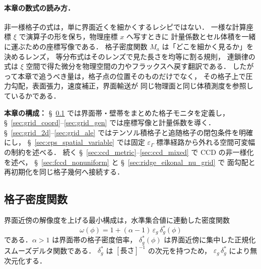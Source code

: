 \paragraph{本章の数式の読み方．}
非一様格子の式は，単に界面近くを細かくするレシピではない．
一様な計算座標 $\xi$ で演算子の形を保ち，物理座標 $x$ へ写すときに
計量係数とセル体積を一緒に運ぶための座標写像である．
格子密度関数 $M_a$ は「どこを細かく見るか」を決めるレンズ，
等分布式はそのレンズで見た長さを均等に割る規則，
連鎖律の式は $\xi$ 空間で得た微分を物理空間の力やフラックスへ戻す翻訳である．
したがって本章で追うべき量は，格子点の位置そのものだけでなく，
その格子上で圧力勾配，表面張力，速度補正，界面輸送が
同じ物理面と同じ体積測度を参照しているかである．

\noindent\textbf{本章の構成：}
§~\ref{sec:grid_density} では界面帯・壁帯をまとめた格子モニタを定義し，
§~\ref{sec:grid_coord}--\ref{sec:grid_gen} では座標写像と計量係数を導く．
§~\ref{sec:grid_2d}--\ref{sec:grid_ale} ではテンソル積格子と追随格子の閉包条件を明確にし，
§~\ref{sec:eps_spatial_variable} では固定 $\varepsilon_\Gamma$ 標準経路から外れる空間可変幅の制約を述べる．
続く §~\ref{sec:ccd_metric}--\ref{sec:ccd_mixed} で CCD の非一様化を述べ，
§~\ref{sec:fccd_nonuniform} と §~\ref{sec:ridge_eikonal_nu_grid} で
面勾配と再初期化を同じ格子幾何へ接続する．

\subsection{格子密度関数}
\label{sec:grid_density}

界面近傍の解像度を上げる最小構成は，水準集合値に連動した密度関数
\begin{equation}
  \omega(\phi) = 1 + (\alpha - 1)\,\varepsilon_g\,\delta_g^*(\phi)
\end{equation}
である．$\alpha > 1$ は界面帯の格子密度倍率，
$\delta_g^*(\phi)$ は界面近傍に集中した正規化スムーズデルタ関数である．
$\delta_g^*$ は $[\text{長さ}]^{-1}$ の次元を持つため，
$\varepsilon_g\,\delta_g^*$ により無次元化する．


